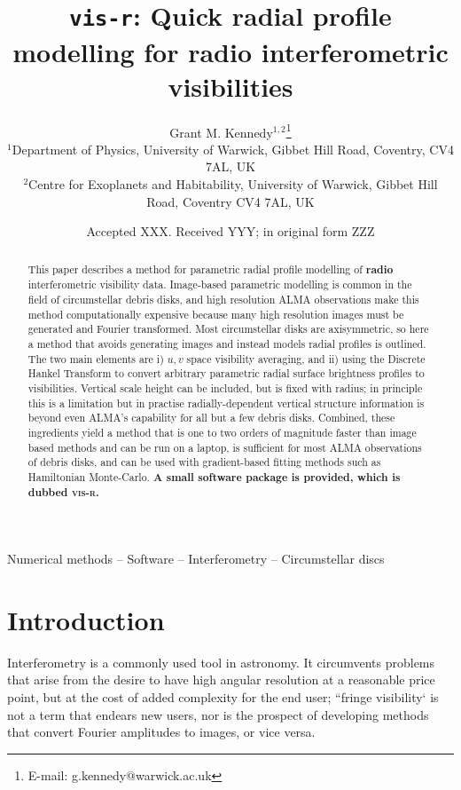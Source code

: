 \documentclass[fleqn,usenatbib]{mnras}
\title[vis-r]{\texttt{vis-r}: Quick radial profile modelling for radio interferometric visibilities}
\author[G. M. Kennedy]{
Grant M. Kennedy$^{1,2}$\thanks{E-mail: g.kennedy@warwick.ac.uk}
\\
$^{1}$Department of Physics, University of Warwick, Gibbet Hill Road, Coventry, CV4 7AL, UK\\
$^{2}$Centre for Exoplanets and Habitability, University of Warwick, Gibbet Hill Road, Coventry CV4 7AL, UK\\
}
\date{Accepted XXX. Received YYY; in original form ZZZ}
\begin{document}
\label{firstpage}
\pagerange{\pageref{firstpage}--\pageref{lastpage}}
\maketitle

\begin{abstract}
This paper describes a method for parametric radial profile modelling of \textbf{radio} interferometric visibility data. Image-based parametric modelling is common in the field of circumstellar debris disks, and high resolution ALMA observations make this method computationally expensive because many high resolution images must be generated and Fourier transformed. Most circumstellar disks are axisymmetric, so here a method that avoids generating images and instead models radial profiles is outlined. The two main elements are i) $u,v$ space visibility averaging, and ii) using the Discrete Hankel Transform to convert arbitrary parametric radial surface brightness profiles to visibilities. Vertical scale height can be included, but is fixed with radius; in principle this is a limitation but in practise radially-dependent vertical structure information is beyond even ALMA's capability for all but a few debris disks. Combined, these ingredients yield a method that is one to two orders of magnitude faster than image based methods and can be run on a laptop, is sufficient for most ALMA observations of debris disks, and can be used with gradient-based fitting methods such as Hamiltonian Monte-Carlo. \textbf{A small software package is provided, which is dubbed \textsc{vis-r}.}
\end{abstract}

\begin{keywords}
Numerical methods -- Software -- Interferometry -- Circumstellar discs
\end{keywords}



\section{Introduction}

Interferometry is a commonly used tool in astronomy. It circumvents problems that arise from the desire to have high angular resolution at a reasonable price point, but at the cost of added complexity for the end user; ``fringe visibility` is not a term that endears new users, nor is the prospect of developing methods that convert Fourier amplitudes to images, or vice versa.
\end{document}
